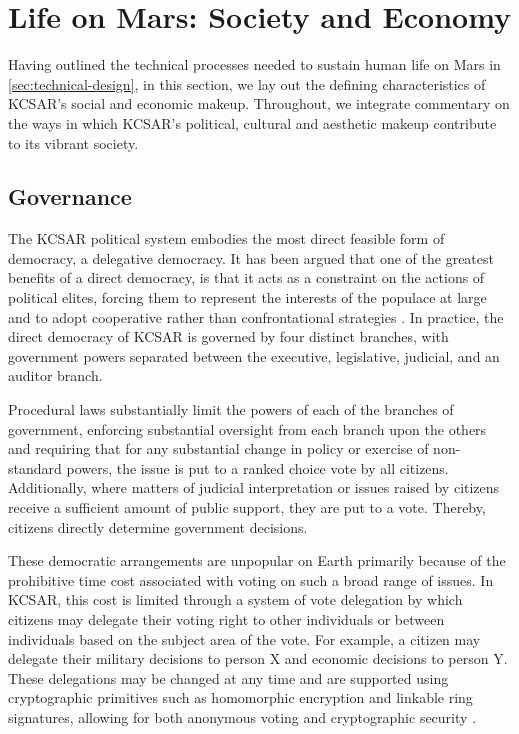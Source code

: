 \documentclass[fleqn,10pt]{Stylesheet} %
\begin{document}
\section{Life on Mars: Society and Economy}
Having outlined the technical processes needed to sustain human life on Mars in \ref{sec:technical-design}, in this section, we lay out the defining characteristics of KCSAR's social and economic makeup. Throughout, we integrate commentary on the ways in which KCSAR's political, cultural and aesthetic makeup contribute to its vibrant society.

\subsection{Governance}
The KCSAR political system embodies the most direct feasible form of democracy, a delegative democracy. It has been argued that one of the greatest benefits of a direct democracy, is that it acts as a constraint on the actions of political elites, forcing them to represent the interests of the populace at large and to adopt cooperative rather than confrontational strategies \cite{Papadopoulos2001}. In practice, the direct democracy of KCSAR is governed by four distinct branches, with government powers separated between the executive, legislative, judicial, and an auditor branch.

Procedural laws substantially limit the powers of each of the branches of government, enforcing substantial oversight from each branch upon the others and requiring that for any substantial change in policy or exercise of non-standard powers, the issue is put to a ranked choice vote by all citizens. Additionally, where matters of judicial interpretation or issues raised by citizens receive a sufficient amount of public support, they are put to a vote. Thereby, citizens directly determine government decisions.


These democratic arrangements are unpopular on Earth primarily because of the prohibitive time cost associated with voting on such a broad range of issues. In KCSAR, this cost is limited through a system of vote delegation by which citizens may delegate their voting right to other individuals or between individuals based on the subject area of the vote. For example, a citizen may delegate their military decisions to person X and economic decisions to person Y. These delegations may be changed at any time and are supported using cryptographic primitives such as homomorphic encryption and linkable ring signatures, allowing for both anonymous voting and cryptographic security \cite{Kaye}.
\end{document}
